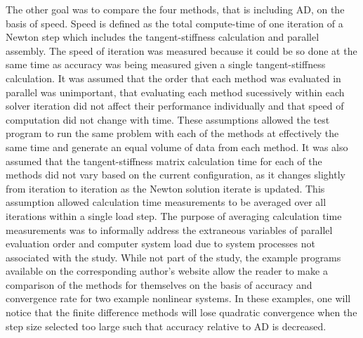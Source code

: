 \documentclass[preprint,12pt]{elsarticle}
\begin{document}
The other goal was to compare the four methods, that is including AD, on the basis of speed. Speed is defined as the total compute-time of one iteration of a Newton step which includes the tangent-stiffness calculation and parallel assembly. The speed of iteration was measured because it could be so done at the same time as accuracy was being measured given a single tangent-stiffness calculation.  It was assumed that the order that each method was evaluated in parallel was unimportant, that evaluating each method sucessively within each solver iteration did not affect their performance individually and that speed of computation did not change with time. These assumptions allowed the test program to run the same problem with each of the methods at effectively the same time and generate an equal volume of data from each method. It was also assumed that the tangent-stiffness matrix calculation time for each of the methods did not vary based on the current configuration, as it changes slightly from iteration to iteration as the Newton solution iterate is updated.  This assumption allowed calculation time measurements to be averaged over all iterations within a single load step. The purpose of averaging calculation time measurements was to informally address the extraneous variables of parallel evaluation order and computer system load due to system processes not associated with the study. While not part of the study, the example programs available on the corresponding author's website allow the reader to make a comparison of the methods for themselves on the basis of accuracy and convergence rate for two example nonlinear systems. In these examples, one will notice that the finite difference methods will lose quadratic convergence when the step size selected too large such that accuracy relative to AD is decreased.
\end{document}
